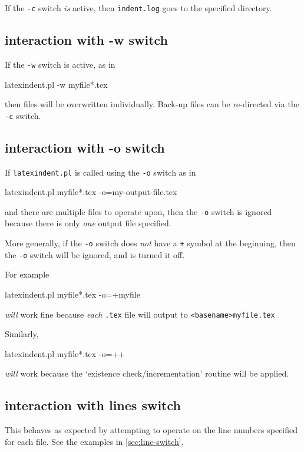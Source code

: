   If the \texttt{-c} switch \emph{is} active, then \texttt{indent.log} goes to the
  specified directory.

 \subsection{interaction with -w switch}
  If the \texttt{-w} switch is active, as in

  \begin{commandshell}
latexindent.pl -w myfile*.tex
\end{commandshell}

  then files will be overwritten individually. Back-up files can be re-directed via the
  \texttt{-c} switch.

 \subsection{interaction with -o switch}
  If \texttt{latexindent.pl} is called using the \texttt{-o} switch as in

  \begin{commandshell}
latexindent.pl myfile*.tex -o=my-output-file.tex
        \end{commandshell}

  and there are multiple files to operate upon, then the \texttt{-o} switch is ignored
  because there is only \emph{one} output file specified.

  More generally, if the \texttt{-o} switch does \emph{not} have a \texttt{+} symbol at
  the beginning, then the \texttt{-o} switch will be ignored, and is turned it off.

  For example

  \begin{commandshell}
latexindent.pl myfile*.tex -o=+myfile
\end{commandshell}

  \emph{will} work fine because \emph{each} \texttt{.tex} file will output to
  \texttt{<basename>myfile.tex}

  Similarly,

  \begin{commandshell}
latexindent.pl myfile*.tex -o=++
\end{commandshell}

  \emph{will} work because the `existence check/incrementation' routine will be applied.

 \subsection{interaction with lines switch}
  This behaves as expected by attempting to operate on the line numbers specified for each file. See
  the examples in \cref{sec:line-switch}.

